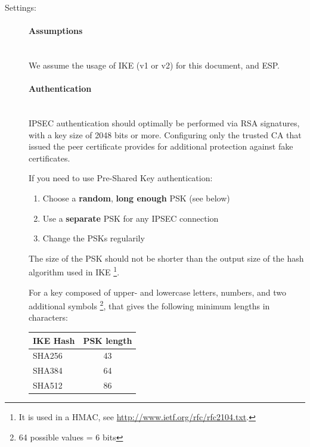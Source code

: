 \begin{description}

\item[Settings:] \mbox{}

\paragraph*{Assumptions}\mbox{}\\

We assume the usage of IKE (v1 or v2) for this document, and ESP.

\paragraph*{Authentication}\mbox{}\\

IPSEC authentication should optimally be performed via RSA signatures,
with a key size of 2048 bits or more. Configuring only the trusted CA
that issued the peer certificate provides for additional protection
against fake certificates.

If you need to use Pre-Shared Key authentication:

\begin{enumerate}
\item Choose a \textbf{random}, \textbf{long enough} PSK (see below)
\item Use a \textbf{separate} PSK for any IPSEC connection
\item Change the PSKs regularily
\end{enumerate}

The size of the PSK should not be shorter than the output size of
the hash algorithm used in IKE \footnote{It is used in a HMAC, see
  \url{http://www.ietf.org/rfc/rfc2104.txt}.}.

For a key composed of upper- and lowercase letters, numbers, and two
additional symbols \footnote{64 possible values = 6 bits}, that gives
the following minimum lengths in characters:

\begin{table}[h]
  \centering
  \small
  \begin{tabular}{lc}
    \toprule
    IKE Hash & PSK length \\
    \midrule
    SHA256 & 43 \\
    SHA384 & 64 \\
    SHA512 & 86 \\
    \bottomrule
  \end{tabular}
\end{table}


\end{description}

